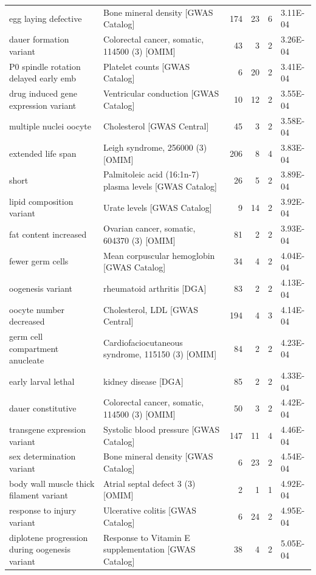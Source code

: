 \begin{table}
\begin{tabulary}{\linewidth}{LLRRRL}
  egg laying defective & Bone mineral density [GWAS Catalog] & 174 & 23 & 6 & 3.11E-04 \\
  dauer formation variant & Colorectal cancer, somatic, 114500 (3) [OMIM] & 43 & 3 & 2 & 3.26E-04 \\
  P0 spindle rotation delayed early emb & Platelet counts [GWAS Catalog] & 6 & 20 & 2 & 3.41E-04 \\
  drug induced gene expression variant & Ventricular conduction [GWAS Catalog] & 10 & 12 & 2 & 3.55E-04 \\
  multiple nuclei oocyte & Cholesterol [GWAS Central] & 45 & 3 & 2 & 3.58E-04 \\
  extended life span & Leigh syndrome, 256000 (3) [OMIM] & 206 & 8 & 4 & 3.83E-04 \\
  short & Palmitoleic acid (16:1n-7) plasma levels [GWAS Catalog] & 26 & 5 & 2 & 3.89E-04 \\
  lipid composition variant & Urate levels [GWAS Catalog] & 9 & 14 & 2 & 3.92E-04 \\
  fat content increased & Ovarian cancer, somatic, 604370 (3) [OMIM] & 81 & 2 & 2 & 3.93E-04 \\
  fewer germ cells & Mean corpuscular hemoglobin [GWAS Catalog] & 34 & 4 & 2 & 4.04E-04 \\
  oogenesis variant & rheumatoid arthritis [DGA] & 83 & 2 & 2 & 4.13E-04 \\
  oocyte number decreased & Cholesterol, LDL [GWAS Central] & 194 & 4 & 3 & 4.14E-04 \\
  germ cell compartment anucleate & Cardiofaciocutaneous syndrome, 115150 (3) [OMIM] & 84 & 2 & 2 & 4.23E-04 \\
  early larval lethal & kidney disease [DGA] & 85 & 2 & 2 & 4.33E-04 \\
  dauer constitutive & Colorectal cancer, somatic, 114500 (3) [OMIM] & 50 & 3 & 2 & 4.42E-04 \\
  transgene expression variant & Systolic blood pressure [GWAS Catalog] & 147 & 11 & 4 & 4.46E-04 \\
  sex determination variant & Bone mineral density [GWAS Catalog] & 6 & 23 & 2 & 4.54E-04 \\
  body wall muscle thick filament variant & Atrial septal defect 3 (3) [OMIM] & 2 & 1 & 1 & 4.92E-04 \\
  response to injury variant & Ulcerative colitis [GWAS Catalog] & 6 & 24 & 2 & 4.95E-04 \\
  diplotene progression during oogenesis variant & Response to Vitamin E supplementation [GWAS Catalog] & 38 & 4 & 2 & 5.05E-04 \\

\end{tabulary}
\end{table}
